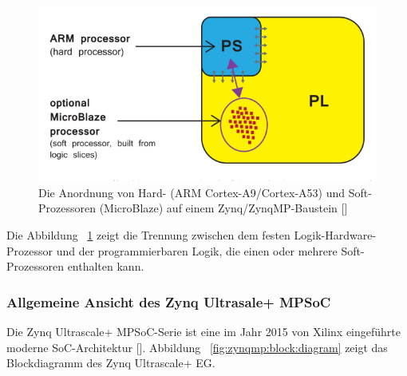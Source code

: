 \begin{figure}[h]
	\begin{center}
		\includegraphics[width=1\textwidth]{./images/ps-pl.jpg}
	\end{center}
	\vspace{-5pt}
	\caption[Hard-(ARM Cortex-A9/Cortex-A53) und Soft-Prozessoren (MicroBlaze)]{Die Anordnung von Hard- (ARM Cortex-A9/Cortex-A53) und Soft-Prozessoren (MicroBlaze) auf einem Zynq/ZynqMP-Baustein [\cite{Crockett:2001018}]}  %
	\label{fig:pl:ps}
	\vspace{-5pt}
\end{figure}


Die Abbildung ~\ref{fig:pl:ps} zeigt die Trennung zwischen dem festen Logik-Hardware-Prozessor und der programmierbaren Logik, die einen oder mehrere Soft-Prozessoren enthalten kann. 

\subsubsection{Allgemeine Ansicht des Zynq Ultrasale+ MPSoC}
Die Zynq Ultrascale+ MPSoC-Serie ist eine im Jahr 2015 von Xilinx eingeführte moderne SoC-Architektur [\cite{CNXSoftware}]. Abbildung ~\ref{fig:zynqmp:block:diagram} zeigt das Blockdiagramm des Zynq Ultrascale+ EG.

